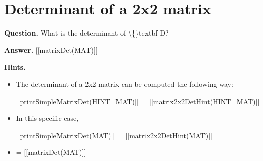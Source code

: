 \documentclass{article}
\begin{document}
\section*{Determinant of a 2x2 matrix}
\textbf{Question.} What is the determinant of \textbackslash\{\}textbf D?

\textbf{Answer.} [[matrixDet(MAT)]]

\textbf{Hints.}
\begin{itemize}
  \item The determinant of a 2x2 matrix can be computed the following way:
                    
                    
                        
                            [[printSimpleMatrixDet(HINT\_MAT)]]
                            = [[matrix2x2DetHint(HINT\_MAT)]]
  \item In this specific case,
                    
                        
                            [[printSimpleMatrixDet(MAT)]]
                            = [[matrix2x2DetHint(MAT)]]
  \item = [[matrixDet(MAT)]]
\end{itemize}
\end{document}
